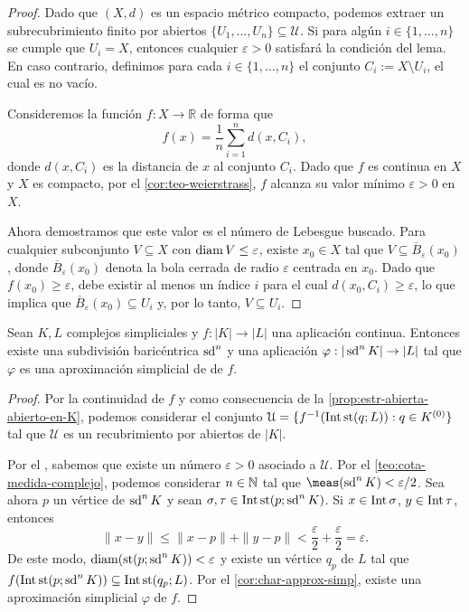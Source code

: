\begin{proof}
	Dado que \((X,d)\) es un espacio métrico compacto, podemos extraer un subrecubrimiento finito por abiertos \(\{U_1, \ldots, U_n\} \subseteq \mathcal{U}\). Si para algún \(i \in \{1, \dots, n\}\) se cumple que \(U_i = X\), entonces cualquier \(\varepsilon > 0\) satisfará la condición del lema. En caso contrario, definimos para cada \(i \in \{1, \ldots, n\}\) el conjunto \(C_i := X \setminus U_i\), el cual es no vacío.
	
	Consideremos la función \( f \colon X \to \mathbb{R} \) de forma que
	\[
		f(x) = \frac{1}{n} \sum_{i=1}^{n} d(x, C_i),
	\]
	 donde \(d(x, C_i)\) es la distancia de \(x\) al conjunto \(C_i\). Dado que \(f\) es continua en \(X\) y \(X\) es compacto, por el \autoref{cor:teo-weierstrass}, \(f\) alcanza su valor mínimo \(\varepsilon > 0\) en \(X\).
	
	Ahora demostramos que este valor es el número de Lebesgue buscado. Para cualquier subconjunto \(V \subseteq X\) con \(\operatorname{diam} V \leq \varepsilon\), existe \(x_0 \in X\) tal que \(V \subseteq \overline{B}_{\varepsilon}(x_0)\), donde \(\overline{B}_{\varepsilon}(x_0)\) denota la bola cerrada de radio \(\varepsilon\) centrada en \(x_0\). Dado que \(f(x_0) \geq \varepsilon\), debe existir al menos un índice \(i\) para el cual \(d(x_0, C_i) \geq \varepsilon\), lo que implica que \(\overline{B}_{\varepsilon}(x_0) \subseteq U_i\) y, por lo tanto, \(V \subseteq U_i\).
\end{proof}
\begin{teorema}
	\label{teo:approx-simp}
	Sean $K,L$ complejos simpliciales y $f: |K| \to |L|$ una aplicación continua. Entonces existe una subdivisión baricéntrica $\operatorname{sd}^n$ y una aplicación $\varphi : |\operatorname{sd}^n K| \to |L|$ tal que $\varphi$ es una aproximación simplicial de de $f$.
\end{teorema}
\begin{proof}
	Por la continuidad de $f$ y como consecuencia de la \autoref{prop:estr-abierta-abierto-en-K}, podemos considerar el conjunto $\mathcal{U} = \{f^{-1}(\operatorname{Int} \operatorname{st}(q;L)) : q \in K^{(0)}\}$ tal que $\mathcal{U}$ es un recubrimiento por abiertos de $|K|$.
	
	Por el , sabemos que existe un número $\varepsilon>0$ asociado a $\mathcal{U}$. Por el \autoref{teo:cota-medida-complejo}, podemos considerar $n \in \mathbb{N}$ tal que $\meas(\sd^n K) < \varepsilon/2$. Sea ahora $p$ un vértice de $\operatorname{sd}^n K$ y sean $\sigma,\tau \in \operatorname{Int} \operatorname{st}(p;\operatorname{sd}^n K)$. Si $x \in \operatorname{Int} \sigma$, $y \in \operatorname{Int} \tau$, entonces
	\[
		\|x-y\| \leq \|x-p\| + \|y-p\| < \frac{\varepsilon}{2} + \frac{\varepsilon}{2} = \varepsilon.
	\]
	De este modo, $\operatorname{diam}(\operatorname{st}(p;\operatorname{sd}^n K)) < \varepsilon$ y existe un vértice $q_p$ de $L$ tal que $f(\operatorname{Int} \operatorname{st}(p;\operatorname{sd}^n K)) \subseteq \operatorname{Int} \operatorname{st}(q_p;L)$. Por el \autoref{cor:char-approx-simp}, existe una aproximación simplicial $\varphi$ de $f$.
\end{proof}
